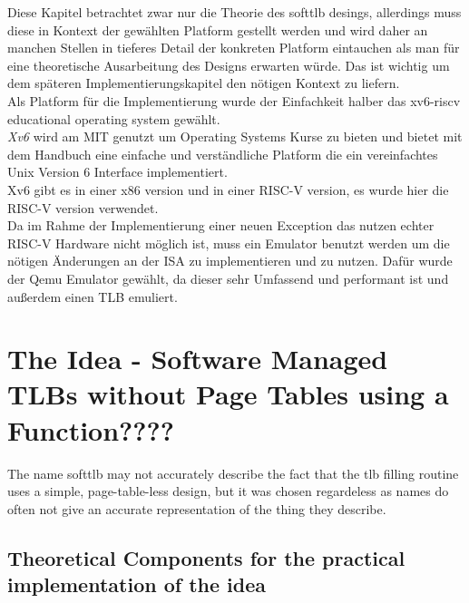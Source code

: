 Diese Kapitel betrachtet zwar nur die Theorie des softtlb desings, allerdings muss diese in Kontext
der gewählten Platform gestellt werden und wird daher an manchen Stellen in tieferes Detail der konkreten
Platform eintauchen als man für eine theoretische Ausarbeitung des Designs erwarten würde.
Das ist wichtig um dem späteren Implementierungskapitel den nötigen Kontext zu liefern.\\
Als Platform für die Implementierung wurde der Einfachkeit halber das xv6-riscv educational operating
system \cite{cox2011xv6} gewählt.\\
\textit{Xv6} wird am MIT genutzt um Operating Systems Kurse zu bieten und bietet mit dem Handbuch eine
einfache und verständliche Platform die ein vereinfachtes Unix Version 6 Interface implementiert.\\
Xv6 gibt es in einer x86 version und in einer RISC-V version, es wurde hier die RISC-V version verwendet.
\\
Da im Rahme der Implementierung einer neuen Exception das nutzen echter RISC-V Hardware nicht möglich
ist, muss ein Emulator benutzt werden um die nötigen Änderungen an der ISA zu implementieren und zu nutzen.
Dafür wurde der Qemu Emulator gewählt, da dieser sehr Umfassend und performant ist und außerdem einen
TLB emuliert.


\section{The Idea - Software Managed TLBs without Page Tables using a Function????}
The name softtlb may not accurately describe the fact that the tlb filling routine uses a simple,
page-table-less design, but it was chosen regardeless as names do often not give an accurate
representation of the thing they describe.
\subsection{Theoretical Components for the practical implementation of the idea}


